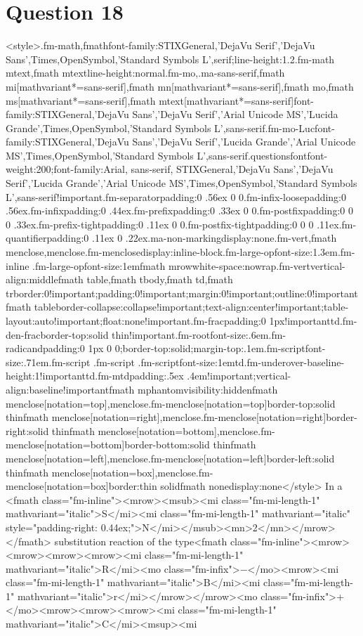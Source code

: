 \documentclass{article}
\begin{document}
\section*{Question 18}
<style>.fm-math,fmath{font-family:STIXGeneral,'DejaVu Serif','DejaVu Sans',Times,OpenSymbol,'Standard Symbols L',serif;line-height:1.2}.fm-math mtext,fmath mtext{line-height:normal}.fm-mo,.ma-sans-serif,fmath mi[mathvariant*=sans-serif],fmath mn[mathvariant*=sans-serif],fmath mo,fmath ms[mathvariant*=sans-serif],fmath mtext[mathvariant*=sans-serif]{font-family:STIXGeneral,'DejaVu Sans','DejaVu Serif','Arial Unicode MS','Lucida Grande',Times,OpenSymbol,'Standard Symbols L',sans-serif}.fm-mo-Luc{font-family:STIXGeneral,'DejaVu Sans','DejaVu Serif','Lucida Grande','Arial Unicode MS',Times,OpenSymbol,'Standard Symbols L',sans-serif}.questionsfont{font-weight:200;font-family:Arial, sans-serif, STIXGeneral,'DejaVu Sans','DejaVu Serif','Lucida Grande','Arial Unicode MS',Times,OpenSymbol,'Standard Symbols L',sans-serif!important}.fm-separator{padding:0 .56ex 0 0}.fm-infix-loose{padding:0 .56ex}.fm-infix{padding:0 .44ex}.fm-prefix{padding:0 .33ex 0 0}.fm-postfix{padding:0 0 0 .33ex}.fm-prefix-tight{padding:0 .11ex 0 0}.fm-postfix-tight{padding:0 0 0 .11ex}.fm-quantifier{padding:0 .11ex 0 .22ex}.ma-non-marking{display:none}.fm-vert,fmath menclose,menclose.fm-menclose{display:inline-block}.fm-large-op{font-size:1.3em}.fm-inline .fm-large-op{font-size:1em}fmath mrow{white-space:nowrap}.fm-vert{vertical-align:middle}fmath table,fmath tbody,fmath td,fmath tr{border:0!important;padding:0!important;margin:0!important;outline:0!important}fmath table{border-collapse:collapse!important;text-align:center!important;table-layout:auto!important;float:none!important}.fm-frac{padding:0 1px!important}td.fm-den-frac{border-top:solid thin!important}.fm-root{font-size:.6em}.fm-radicand{padding:0 1px 0 0;border-top:solid;margin-top:.1em}.fm-script{font-size:.71em}.fm-script .fm-script .fm-script{font-size:1em}td.fm-underover-base{line-height:1!important}td.fm-mtd{padding:.5ex .4em!important;vertical-align:baseline!important}fmath mphantom{visibility:hidden}fmath menclose[notation=top],menclose.fm-menclose[notation=top]{border-top:solid thin}fmath menclose[notation=right],menclose.fm-menclose[notation=right]{border-right:solid thin}fmath menclose[notation=bottom],menclose.fm-menclose[notation=bottom]{border-bottom:solid thin}fmath menclose[notation=left],menclose.fm-menclose[notation=left]{border-left:solid thin}fmath menclose[notation=box],menclose.fm-menclose[notation=box]{border:thin solid}fmath none{display:none}</style> In a <fmath class="fm-inline"><mrow><msub><mi class="fm-mi-length-1" mathvariant="italic">S</mi><mi class="fm-mi-length-1" mathvariant="italic" style="padding-right: 0.44ex;">N</mi></msub><mn>2</mn></mrow></fmath> substitution reaction of the type\newline<fmath class="fm-inline"><mrow><mrow><mrow><mrow><mi class="fm-mi-length-1" mathvariant="italic">R</mi><mo class="fm-infix">−</mo><mrow><mi class="fm-mi-length-1" mathvariant="italic">B</mi><mi class="fm-mi-length-1" mathvariant="italic">r</mi></mrow></mrow><mo class="fm-infix">+</mo><mrow><mrow><mrow><mi class="fm-mi-length-1" mathvariant="italic">C</mi><msup><mi 
\end{document}
